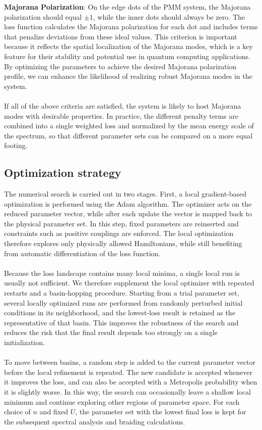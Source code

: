 \textbf{Majorana Polarization}: On the edge dots of the PMM system, the Majorana polarization should equal $\pm 1$, while the inner dots should always be zero. The loss function calculates the Majorana polarization for each dot and includes terms that penalize deviations from these ideal values. This criterion is important because it reflects the spatial localization of the Majorana modes, which is a key feature for their stability and potential use in quantum computing applications. By optimizing the parameters to achieve the desired Majorana polarization profile, we can enhance the likelihood of realizing robust Majorana modes in the system.\\ \\
If all of the above criteria are satisfied, the system is likely to host Majorana modes with desirable properties. In practice, the different penalty terms are combined into a single weighted loss and normalized by the mean energy scale of the spectrum, so that different parameter sets can be compared on a more equal footing.

\subsection{Optimization strategy}\label{sec:optimization_strategy}
The numerical search is carried out in two stages. First, a local gradient-based optimization is performed using the Adam algorithm. The optimizer acts on the reduced parameter vector, while after each update the vector is mapped back to the physical parameter set. In this step, fixed parameters are reinserted and constraints such as positive couplings are enforced. The local optimization therefore explores only physically allowed Hamiltonians, while still benefiting from automatic differentiation of the loss function. \\ \\
Because the loss landscape contains many local minima, a single local run is usually not sufficient. We therefore supplement the local optimizer with repeated restarts and a basin-hopping procedure. Starting from a trial parameter set, several locally optimized runs are performed from randomly perturbed initial conditions in its neighborhood, and the lowest-loss result is retained as the representative of that basin. This improves the robustness of the search and reduces the risk that the final result depends too strongly on a single initialization. \\ \\
To move between basins, a random step is added to the current parameter vector before the local refinement is repeated. The new candidate is accepted whenever it improves the loss, and can also be accepted with a Metropolis probability when it is slightly worse. In this way, the search can occasionally leave a shallow local minimum and continue exploring other regions of parameter space. For each choice of $n$ and fixed $U$, the parameter set with the lowest final loss is kept for the subsequent spectral analysis and braiding calculations.

